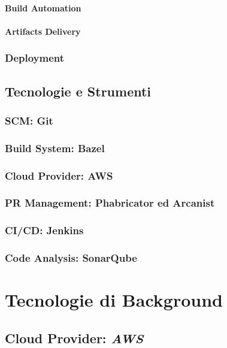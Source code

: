 \documentclass[a4paper,12pt]{report}
\begin{document}
	\subsubsection{Build Automation}
	
	\subsubsection{Artifacts Delivery}
	
	\subsection{Deployment}
	
	\section{Tecnologie e Strumenti}
	
	\subsection{SCM: Git}
	
	\subsection{Build System: Bazel}
	
	\subsection{Cloud Provider: AWS}
	
	\subsection{PR Management: Phabricator ed Arcanist}
	
	\subsection{CI/CD: Jenkins}
	
	\subsection{Code Analysis: SonarQube}
	
	\chapter{Tecnologie di Background}
	
	\section{Cloud Provider: \emph{AWS}}
	
\end{document}
